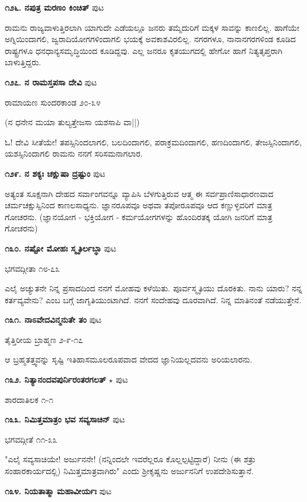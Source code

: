 \medskip
\noindent\textbf{೧೨೬. ನಪುತ್ರ ಮರಣಂ ಕಿಂಚಿತ್} \hfill ಪುಟ \pageref{180}

ರಾಮನು ರಾಜ್ಯವಾಳುತ್ತಿರಲಾಗಿ ಯಾಗುದೇ ಎಡೆಯಲ್ಲೂ ಜನರು ತಮ್ಮೆದುರಿಗೆ ಮಕ್ಕಳ ಸಾವನ್ನು ಕಾಣಲಿಲ್ಲ. ಹಾಗೆಯೇ ಅಗ್ನಿಯಿಂದಾಗಲಿ, ಜ್ವರಾದಿಯೋಗಗಳಿಂದಾಗಲಿ ಭಯಕ್ಕೆ ಅವಕಾಶವಿರಲಿಲ್ಲ. ನಗರಗಳೂ, ನಾನಾನಗರಗಳಿಂಡ ಕೂಡಿದ ರಾಷ್ಟ್ರಗಳೂ ಧನಧಾನ್ಯಸಮೃದ್ಧಿಯಿಂದ ಕೂಡಿದ್ದವು. ಎಲ್ಲ ಜನರೂ ಕೃತಯುಗದಲ್ಲಿ ಹೇಗೋ ಹಾಗೆ ನಿತ್ಯತೃಪ್ತರಾಗಿ ಬಾಳುತ್ತಿದ್ದರು.

\medskip
\noindent\textbf{೧೨೭. ನ ರಾಮಸ್ತಪಸಾ ದೇವಿ} \hfill ಪುಟ \pageref{181}

\hfill ರಾಮಾಯಣ ಸುಂದರಕಾಂಡ ೨೦-೩೪

(ನ ಧನೇನ ಮಯಾ ತುಲ್ಯತ್ತೇಜಸಾ ಯಶಸಾಪಿ ವಾ||)

ಓ! ದೇವಿ ಸೀತೆಯೇ! ತಪಸ್ಸಿನಿಂದಲಾಗಲಿ, ಬಲದಿಂದಾಗಲಿ, ಪರಾಕ್ರಮದಿಂದಾಗಲಿ, ಹಣದಿಂದಾಗಲಿ, ತೇಜಸ್ಸಿನಿಂದಾಗಲಿ, ಯಶಸ್ಸಿನಿಂದಾಗಲಿ ರಾಮನು ನನಗೆ ಸರಿಸಮನಾಗಲಾರ. 

\medskip
\noindent\textbf{೧೨೯. ನ ಶಕ್ಯಃ ಚಕ್ಷುಷಾ ದ್ರಷ್ಟುಂ} \hfill ಪುಟ \pageref{246}

ಅತ್ಯಂತ ಸೂಕ್ಷನಾಗಿ ದೇಹದ ಸರ್ವಾಂಗವನ್ನೂ ವ್ಯಾಪಿಸಿ ಬೆಳಗುತ್ತಿರುವ ಆತ್ಮ ಈ ಸರ್ವಪ್ರಾಣಿಸಾಧಾರಣವಾದ ಚರ್ಮಚಕ್ಷುಸ್ಸಿನಿಂದ ಕಾಣಲಸಾಧ್ಯನು. ಜ್ಞಾನರೂಪವೂ ಅಥವಾ ತಪೋರೂಪವೂ ಆದ ಕಣ್ಣುಳ್ಳವರಿಗೆ ಮಾತ್ರ ಗೋಚರನು. (ಜ್ಞಾನಯೋಗ - ಭಕ್ತಿಯೋಗ - ಕರ್ಮಯೋಗಗಳನ್ನು ಹೊಂದಿರತಕ್ಕ ಯೋಗಿ ಜನರಿಗೆ ಮಾತ್ರ ಗೋಚರನು)

\medskip
\noindent\textbf{೧೩೦. ನಷ್ಟೋ ಮೋಹಃ ಸ್ಮೃತಿರ್ಲಬ್ಧಾ} \hfill ಪುಟ \pageref{91-104}

\hfill ಭಗವದ್ಗೀತಾ ೧೮-೭೩

ಎಲೈ ಅಚ್ಯುತನೇ ನಿನ್ನ ಪ್ರಸಾದದಿಂದ ನನಗೆ ಮೋಹವು ಕಳೆಯಿತು. ಪೂರ್ವಸ್ಮೃತಿಯು ದೊರಕಿತು. ನಾನು ಯಾರು? ನನ್ನ ಕರ್ತವ್ಯವೇನು? ಎಂಬ ಬಗ್ಗೆ ಜಾಗೃತಿಯುಂಟಾಗಿದೆ. ನನಗೆ ಸಂದೇಹವು ದೂರವಾಗಿದೆ. ನಿನ್ನ ಮಾತಿನಂತೆ ನಡೆಯುತ್ತೇನೆ.

\medskip
\noindent\textbf{೧೩೧. ನಾಽವೇದವಿನ್ಮನುತೇ ತಂ} \hfill ಪುಟ \pageref{106}

\hfill ತೈತ್ತಿರೀಯ ಬ್ರಾಹ್ಮಣ ೨-೯-೧೭

ಆ ಬ್ರಹ್ಮತತ್ತ್ವವನ್ನು ಸೃಷ್ಟಿ ಇತಿಹಾಸಮೂಲರೂಪವಾದ  ವೇದದ ಜ್ಞಾನಿಯಲ್ಲದವನು ಅರಿಯಲಾರನು.

\medskip
\noindent\textbf{೧೩೨. ನಿತ್ಯಾನಂದವಪುರ್ನಿರಂತರಗಲತ್} $\star$ \hfill ಪುಟ \pageref{31}

\hfill ಶಾರದಾತಿಲಕ ೧-೧

\medskip
\noindent\textbf{೧೩೩. ನಿಮಿತ್ತಮಾತ್ರಂ ಭವ ಸವ್ಯಸಾಚಿನ್} \hfill ಪುಟ \pageref{214}

\hfill ಭಗವದ್ಗೀತೆ ೧೧-೩೩

"ಎಲೈ ಸವ್ಯಸಾಚಿಯೇ! ಅರ್ಜುನನೇ! (ನನ್ನಿಂದಲೇ ಇವರೆಲ್ಲರೂ ಕೊಲ್ಲಲ್ಪಟ್ಟಿದ್ದಾರೆ) ನೀನು (ಈ ಶತ್ರು ಸಂಹಾರಕಾರ್ಯದಲ್ಲಿ) ನಿಮಿತ್ತಮಾತ್ರವಾಗಿರು" ಎಂದು ಶ್ರೀಕೃಷ್ಣನು ಅರ್ಜುನನಿಗೆ ಉಪದೇಶಿಸುತ್ತಾನೆ.

\medskip
\noindent\textbf{೧೩೪. ನಿಯತಾತ್ಮಾ ಮಹಾವೀರ್ಯಃ} \hfill ಪುಟ \pageref{247}

